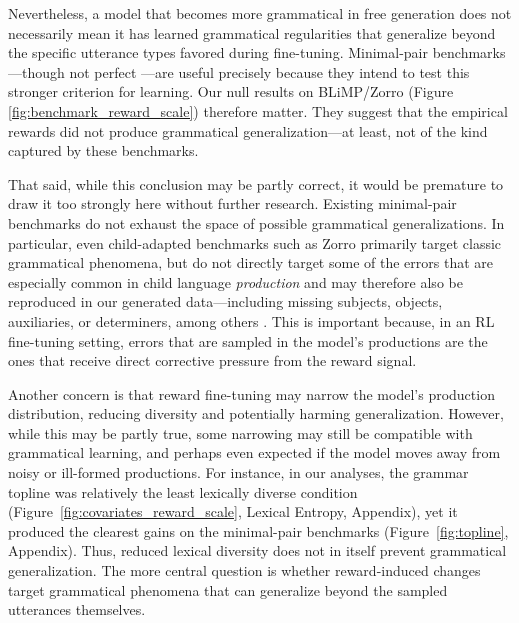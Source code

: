 Nevertheless, a model that becomes more grammatical in free generation does not necessarily mean it has learned grammatical regularities that generalize beyond the specific utterance types favored during fine-tuning.
Minimal-pair benchmarks---though not perfect \cite{martinez2023evaluating}---are useful precisely because they intend to test this stronger criterion for learning. Our null results on BLiMP/Zorro (Figure \ref{fig:benchmark_reward_scale}) therefore matter. They suggest that the empirical rewards did not produce grammatical generalization---at least, not of the kind captured by these benchmarks.

That said, while this conclusion may be partly correct, it would be premature to draw it too strongly here without further research. Existing minimal-pair benchmarks do not exhaust the space of possible grammatical generalizations. In particular, even child-adapted benchmarks such as Zorro primarily target classic grammatical phenomena, but do not directly target some of the errors that are especially common in child language \textit{production} and may therefore also be reproduced in our generated data---including missing subjects, objects, auxiliaries, or determiners, among others \cite{saxton2005prompt, hiller_data-driven_2016, nikolaus_automatic_2024}. This is important because, in an RL fine-tuning setting,  errors that are sampled in the model's productions are the ones that receive direct corrective pressure from the reward signal.

Another concern is that reward fine-tuning may narrow the model’s production distribution, reducing diversity and potentially harming generalization. However, while this may be partly true, some narrowing may still be compatible with grammatical learning, and perhaps even expected if the model moves away from noisy or ill-formed productions. For instance, in our analyses, the grammar topline was relatively the least lexically diverse condition (Figure~\ref{fig:covariates_reward_scale}, Lexical Entropy, Appendix), yet it produced the clearest gains on the minimal-pair benchmarks (Figure~\ref{fig:topline}, Appendix). Thus, reduced lexical diversity does not in itself prevent grammatical generalization. The more central question is whether reward-induced changes target grammatical phenomena that can generalize beyond the sampled utterances themselves.

